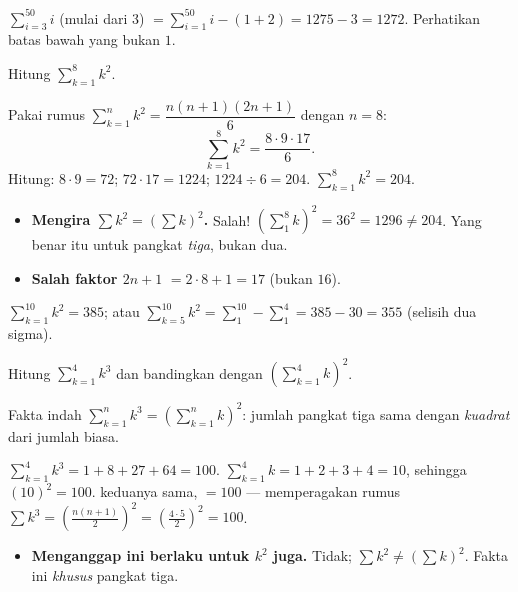 \begin{variasi}
$\sum_{i=3}^{50}i$ (mulai dari 3) $=\sum_{i=1}^{50}i-(1+2)=1275-3=1272$.
Perhatikan batas bawah yang bukan $1$.
\end{variasi}

\begin{soalbox}{}
Hitung $\displaystyle\sum_{k=1}^{8}k^2$.
\end{soalbox}

\jawab
{} Pakai rumus $\sum_{k=1}^{n}k^2=\dfrac{n(n+1)(2n+1)}{6}$ dengan $n=8$:
\[
\sum_{k=1}^{8}k^2=\frac{8\cdot9\cdot17}{6}.
\]
 Hitung: $8\cdot9=72$; $72\cdot17=1224$; $1224\div6=204$.
\jadi $\displaystyle\sum_{k=1}^{8}k^2=204$.

\begin{jebakan}
\begin{itemize}[leftmargin=*,topsep=2pt]
  \item \textbf{Mengira $\sum k^2=(\sum k)^2$.} Salah! $(\sum_{1}^{8}k)^2=36^2=1296
  \neq204$. Yang benar itu untuk pangkat \emph{tiga}, bukan dua.
  \item \textbf{Salah faktor $2n+1$} $=2\cdot8+1=17$ (bukan $16$).
\end{itemize}
\end{jebakan}

\begin{variasi}
$\sum_{k=1}^{10}k^2=385$; atau $\sum_{k=5}^{10}k^2=\sum_1^{10}-\sum_1^{4}
=385-30=355$ (selisih dua sigma).
\end{variasi}

\begin{soalbox}{}
Hitung $\displaystyle\sum_{k=1}^{4}k^3$ dan bandingkan dengan
$\left(\sum_{k=1}^{4}k\right)^2$.
\end{soalbox}

\begin{ingat}{Fakta indah}
$\displaystyle\sum_{k=1}^{n}k^3=\left(\sum_{k=1}^{n}k\right)^2$: jumlah pangkat
tiga sama dengan \emph{kuadrat} dari jumlah biasa.
\end{ingat}

\jawab
{} $\sum_{k=1}^{4}k^3=1+8+27+64=100$.
 $\sum_{k=1}^{4}k=1+2+3+4=10$, sehingga $(10)^2=100$.
\jadi keduanya sama, $=100$ --- memperagakan rumus
$\sum k^3=\left(\frac{n(n+1)}{2}\right)^2=\left(\frac{4\cdot5}{2}\right)^2=100$.

\begin{jebakan}
\begin{itemize}[leftmargin=*,topsep=2pt]
  \item \textbf{Menganggap ini berlaku untuk $k^2$ juga.} Tidak;
  $\sum k^2\neq(\sum k)^2$. Fakta ini \emph{khusus} pangkat tiga.
\end{itemize}
\end{jebakan}

